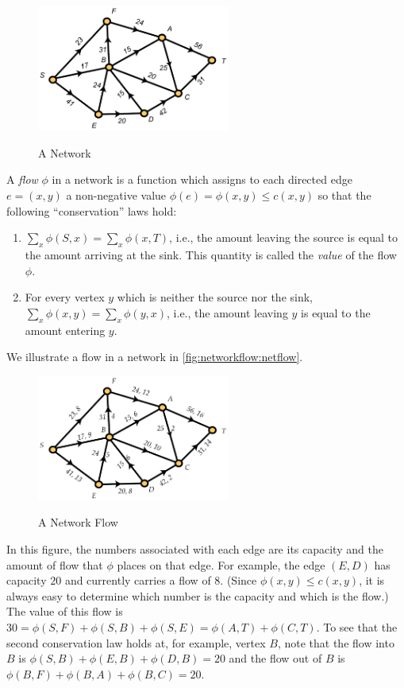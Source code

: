 \begin{figure}
\centering
\includegraphics*[width=2.5in]{networkflow-figs/webfig-31a}\\
\caption{A Network}\label{fig:networkflow:network}
\end{figure}

A \textit{flow} $\phi$ in a network is a function which assigns to
each directed edge $e=(x,y)$ a non-negative value
$\phi(e)=\phi(x,y)\leq c(x,y)$ so that the following ``conservation''
laws hold:

\begin{enumerate}
\item $\sum_{x} \phi(S,x)= \sum_{x} \phi(x,T)$, i.e., the amount leaving
the source is equal to the amount arriving at the sink.  This quantity
is called the \textit{value} of the flow $\phi$.
\item For every vertex $y$ which is neither the source nor the
sink, $\sum_{x}\phi(x,y)= \sum_{x}\phi(y,x)$, i.e., the amount leaving $y$ 
is equal to the amount entering $y$.
\end{enumerate}

We illustrate a flow in a network in
\autoref{fig:networkflow:netflow}. 
\begin{figure}[hb]
\begin{center}
\includegraphics*[width=2.5in]{networkflow-figs/webfig-31b}\\
\caption{A Network Flow}\label{fig:networkflow:netflow}
\end{center}
\end{figure}
In this figure, the numbers associated with each edge are its capacity
and the amount of flow that $\phi$ places on that edge. For example,
the edge $(E,D)$ has capacity $20$ and currently carries a flow of
$8$. (Since $\phi(x,y)\leq c(x,y)$, it is always easy to determine
which number is the capacity and which is the flow.) The value of this
flow is $30 = \phi(S,F)+\phi(S,B)+\phi(S,E)=\phi(A,T)+\phi(C,T)$. To
see that the second conservation law holds at, for example, vertex
$B$, note that the flow into $B$ is $\phi(S,B)+\phi(E,B)+\phi(D,B) =
20$ and the flow out of $B$ is $\phi(B,F)+\phi(B,A)+\phi(B,C)=20$.

